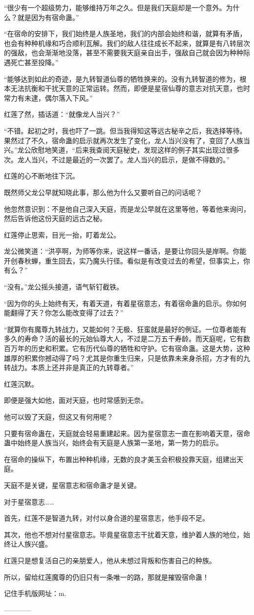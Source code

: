 \begin{this_body}
“很少有一个超级势力，能够维持万年之久。但是我们天庭却是一个意外。为什么？就是因为有宿命蛊。”

“在宿命的安排下，我们始终是人族圣地，我们的内部会始终和谐，就算有矛盾，也会有种种机缘和巧合顺利瓦解。我们的敌人往往成长不起来，就算是有八转层次的强敌，也会渐渐地没落，甚至不需要我天庭亲自出手，强敌自己就会因为种种际遇死亡甚至投降。”

“能够达到如此的奇迹，是九转智道仙尊的牺牲换来的。没有九转智道的修为，根本无法抗衡和干扰天意的正常运转。然而，即便是星宿仙尊的意志对抗天意，也时常力有未逮，偶尔落入下风。”

红莲了然，插话道：“就像龙人当兴？”

“不错。起初之时，我也吓了一跳。但当我得知这等远古秘辛之后，我选择等待。果然过了不久，宿命蛊的启示就再次发生了变化，龙人当兴没有了，变回了人族当兴。”龙公欣慰地笑道，“后来我查阅天庭秘史，发现这样的例子其实出现过很多次。龙人当兴，不过是最近的一次罢了。龙人当兴的启示，是做不得数的。”

红莲的心不断地往下沉。

既然师父龙公早就知晓此事，那么他为什么又要听自己的问话呢？

他忽然意识到：不是他自己深入天庭，而是龙公早就在这里等他，等着他来询问，然后告诉他这份天庭的远古之秘。

红莲停止思索，目光一抬，盯着龙公。

龙公微笑道：“洪亭啊，为师等你来，说这样一番话，是要让你回头是岸啊。你能开创春秋蝉，重生回去，实乃魔头行径。看似是有改变过去的希望，但事实上，你有么？”

“没有。”龙公摇头接道，语气斩钉截铁。

“因为你的头上始终有天，有着天道，有着星宿意志，有着宿命蛊的启示。你如何能翻得了天？你怎么能改变得了过去？”

“就算你有魔尊九转战力，又能如何？无极、狂蛮就是最好的例证。一位尊者能有多久的寿命？活的最长的元始仙尊大人，不过是二万五千寿龄。而天庭呢，它有数百万年的历史和积累。它有历代仙尊的牺牲和守护。它有宿命蛊。这是大势，这种雄厚的积累你撼动得了吗？尤其是你重生归来，只是依靠未来身杀招，方才有的九转战力。本质上还并非是真正的九转尊者。”

红莲沉默。

即便是强大如他，面对天庭，也时常感到无奈。

他可以毁了天庭，但这又有何用呢？

只要有宿命蛊在，天庭就会轻易重建起来。因为星宿意志一直在影响着天意，宿命蛊中始终是人族当兴，始终会有天庭是人族第一圣地，第一势力的启示。

在宿命的操纵下，布置出种种机缘，无数的良才美玉会积极投靠天庭，组建出天庭。

天庭不是关键，星宿意志和宿命蛊才是关键。

对于星宿意志……

首先，红莲不是智道九转，对付以身合道的星宿意志，他手段不足。

其次，他也不想对付星宿意志。毕竟星宿意志干扰着天意，维护着人族的地位，始终让人族兴盛。

红莲只是想复活自己的亲朋爱人，他从未想过背叛和伤害自己的种族。

所以，留给红莲魔尊的仍旧只有一条唯一的路，那就是摧毁宿命蛊！

记住手机版网址：m.

------------

\end{this_body}

